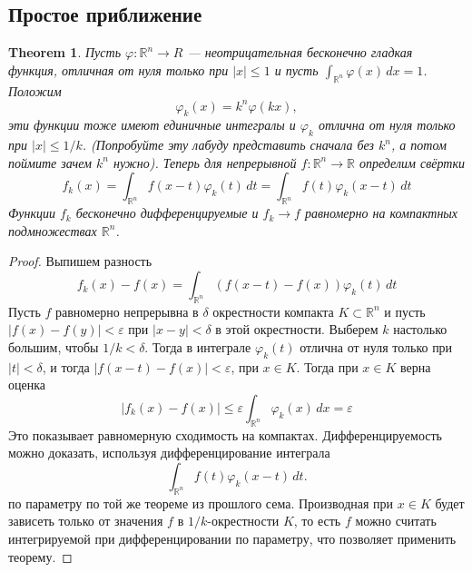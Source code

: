 \documentclass[a4paper,12pt]{article} %
\newtheorem{theorem}{Theorem}
\theoremstyle{definition}
\begin{document}
\subsection{Простое приближение}
\begin{theorem}
	Пусть $\varphi : \mathbb{R}^n \rightarrow R$ --- неотрицательная бесконечно гладкая функция, отличная от нуля только при $|x| \leq 1$ и пусть  $\int_{\mathbb{R}^n} \varphi(x) \, dx = 1$. Положим 
	\begin{equation}
		\varphi_k (x) = k^n \varphi (kx),
	\end{equation}
	эти функции тоже имеют единичные интегралы и $\varphi_k$ отлична от нуля только при $|x| \leq 1/k$. (Попробуйте эту лабуду представить сначала без $k^n$, а потом поймите зачем $k^n$ нужно). Теперь для непрерывной $f : \mathbb{R}^n \rightarrow \mathbb{R}$ определим свёртки
	\begin{equation}
		f_k (x) = \int_{\mathbb{R}^n} f(x - t) \varphi_k(t) \, dt = \int_{\mathbb{R}^n} f(t) \varphi_k(x - t) \, dt
	\end{equation}
	Функции $f_k$ бесконечно дифференцируемые и $f_k \rightarrow f$ равномерно на компактных  подмножествах $\mathbb{R}^ n$.
\end{theorem}
\begin{proof}
	Выпишем разность
	\begin{equation}
		f_k(x) - f(x) = \int_{\mathbb{R}^n} (f(x - t) - f(x)) \varphi_k (t) \, dt
	\end{equation}
	Пусть $f$ равномерно непрерывна в $\delta$ окрестности компакта $K \subset \mathbb{R}^n$ и пусть$|f(x) - f(y)|< \varepsilon$ при $|x - y|< \delta$ в этой окрестности. Выберем $k$ настолько большим, чтобы $1/k < \delta$. Тогда в интеграле $\varphi_k (t)$ отлична от нуля только при $|t|< \delta$, и тогда $|f(x - t) - f(x)|< \varepsilon$, при $x \in K$. Тогда при $x \in K$ верна оценка
	\begin{equation}
		|f_k (x) - f(x)| \leq \varepsilon \int_{\mathbb{R}^n} \varphi_k (x) \, dx  = \varepsilon	
	\end{equation}
	Это показывает равномерную сходимость на компактах. Дифференцируемость можно доказать, используя  дифференцирование интеграла
	\begin{equation}
		\int_{\mathbb{R}^n} f(t) \varphi_k (x - t) \, dt.
	\end{equation}
	по параметру по той же теореме из прошлого сема. Производная при $x \in K$ будет зависеть только от значения $f$ в $1/k$-окрестности $K$, то есть $f$ можно  считать интегрируемой  при дифференцировании по параметру, что позволяет применить теорему.
\end{proof}
\end{document}
